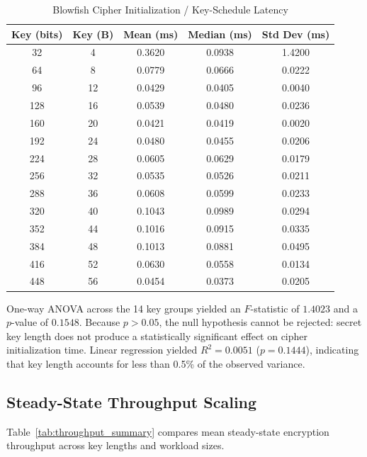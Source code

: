 \documentclass[conference]{IEEEtran}
\begin{document}
\begin{table}[htbp]
\caption{Blowfish Cipher Initialization / Key-Schedule Latency}
\label{tab:init_time}
\centering
\begin{tabular}{ccccc}
\toprule
\textbf{Key (bits)} & \textbf{Key (B)} & \textbf{Mean (ms)} & \textbf{Median (ms)} & \textbf{Std Dev (ms)} \\
\midrule
32  & 4  & 0.3620 & 0.0938 & 1.4200 \\
64  & 8  & 0.0779 & 0.0666 & 0.0222 \\
96  & 12 & 0.0429 & 0.0405 & 0.0040 \\
128 & 16 & 0.0539 & 0.0480 & 0.0236 \\
160 & 20 & 0.0421 & 0.0419 & 0.0020 \\
192 & 24 & 0.0480 & 0.0455 & 0.0206 \\
224 & 28 & 0.0605 & 0.0629 & 0.0179 \\
256 & 32 & 0.0535 & 0.0526 & 0.0211 \\
288 & 36 & 0.0608 & 0.0599 & 0.0233 \\
320 & 40 & 0.1043 & 0.0989 & 0.0294 \\
352 & 44 & 0.1016 & 0.0915 & 0.0335 \\
384 & 48 & 0.1013 & 0.0881 & 0.0495 \\
416 & 52 & 0.0630 & 0.0558 & 0.0134 \\
448 & 56 & 0.0454 & 0.0373 & 0.0205 \\
\bottomrule
\end{tabular}
\end{table}

One-way ANOVA across the 14 key groups yielded an $F$-statistic of $1.4023$ and a $p$-value of $0.1548$. Because $p > 0.05$, the null hypothesis cannot be rejected: secret key length does not produce a statistically significant effect on cipher initialization time. Linear regression yielded $R^2 = 0.0051$ ($p = 0.1444$), indicating that key length accounts for less than 0.5\% of the observed variance.

\subsection{Steady-State Throughput Scaling}
Table~\ref{tab:throughput_summary} compares mean steady-state encryption throughput across key lengths and workload sizes.
\end{document}
